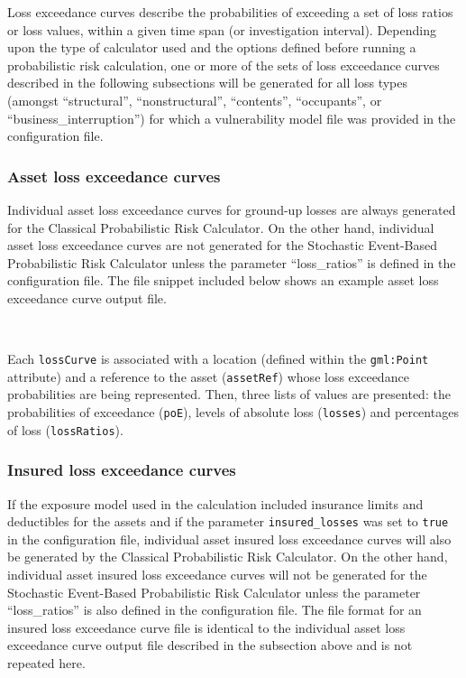 Loss exceedance curves describe the probabilities of exceeding a set of loss
ratios or loss values, within a given time span (or investigation interval).
Depending upon the type of calculator used and the options defined before
running a probabilistic risk calculation, one or more of the sets of loss
exceedance curves described in the following subsections will be generated for
all loss types (amongst ``structural'', ``nonstructural'', ``contents'',
``occupants'', or ``business\_interruption'') for which a vulnerability model
file was provided in the configuration file.

\subsubsection{Asset loss exceedance curves}
\label{subsubsec:asset_loss_curves}

Individual asset loss exceedance curves for ground-up losses are always
generated for the Classical Probabilistic Risk Calculator. On the other hand,
individual asset loss exceedance curves are not generated for the Stochastic
Event-Based Probabilistic Risk Calculator unless the parameter ``loss\_ratios''
is defined in the configuration file. The file snippet included below shows an
example asset loss exceedance curve output file.

\inputminted[firstline=1,firstnumber=1,fontsize=\footnotesize,frame=single,bgcolor=lightgray]{xml}{oqum/risk/verbatim/output_loss_curve_asset.xml}\\

Each \Verb+lossCurve+ is associated with a location (defined within the
\Verb+gml:Point+ attribute) and a reference to the \gls{asset}
(\Verb+assetRef+) whose loss exceedance probabilities are being represented.
Then, three lists of values are presented: the probabilities of exceedance
(\Verb+poE+), levels of absolute loss (\Verb+losses+) and percentages of loss
(\Verb+lossRatios+).

\subsubsection{Insured loss exceedance curves}
\label{subsubsec:insured_loss_curves}

If the exposure model used in the calculation included insurance limits and
deductibles for the assets and if the parameter \Verb+insured_losses+ was set
to \Verb+true+ in the configuration file, individual asset insured loss
exceedance curves will also be generated by the Classical Probabilistic Risk
Calculator. On the other hand, individual asset insured loss exceedance curves
will not be generated for the Stochastic Event-Based Probabilistic Risk
Calculator unless the parameter ``loss\_ratios'' is also defined in the
configuration file. The file format for an insured loss exceedance curve file
is identical to the individual asset loss exceedance curve output file
described in the subsection above and is not repeated here.

